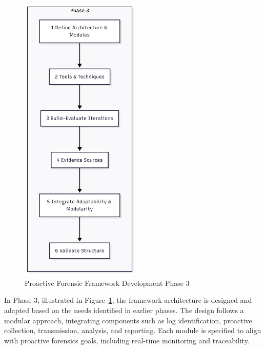 \begin{figure}[H]
    \centering
    \includegraphics[height=14cm]{figure/framework-development-phase-3.png}
    \caption{Proactive Forensic Framework Development Phase 3}
    \label{fig:framework-development-phase-3}
\end{figure}
In Phase 3, illustrated in Figure~\ref{fig:framework-development-phase-3}, the framework architecture is designed and adapted based on the needs identified in earlier phases. The design follows a modular approach, integrating components such as log identification, proactive collection, transmission, analysis, and reporting. Each module is specified to align with proactive forensics goals, including real-time monitoring and traceability.


